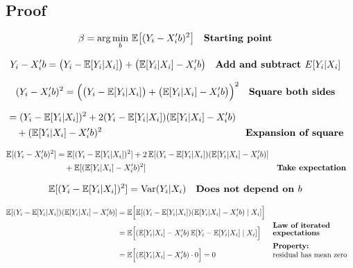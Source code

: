 \documentclass[12pt]{article}
\begin{document}
\subsection*{\noindent\textbf{Proof}}

\singlespacing
\begin{align}
\beta &= \arg \min_b \, \mathbb{E}\big[(Y_i - X_i'b)^2\big] && \text{\textbf{Starting point}} 
\end{align}

\begin{align}
Y_i - X_i'b 
    &= \big(Y_i - \mathbb{E}[Y_i|X_i]\big) + \big(\mathbb{E}[Y_i|X_i] - X_i'b\big) && \text{\textbf{Add and subtract $E[Y_i|X_i]$}} 
\end{align}

\begin{align}
(Y_i - X_i'b)^2 
    &= \Big(\big(Y_i - \mathbb{E}[Y_i|X_i]\big) + \big(\mathbb{E}[Y_i|X_i] - X_i'b\big)\Big)^2 && \text{\textbf{Square both sides}} 
\end{align}

\begin{align}
&= (Y_i - \mathbb{E}[Y_i|X_i])^2 
   + 2(Y_i - \mathbb{E}[Y_i|X_i])(\mathbb{E}[Y_i|X_i] - X_i'b) \\
&\quad + (\mathbb{E}[Y_i|X_i] - X_i'b)^2 && \text{\textbf{Expansion of square}} 
\end{align}

\begin{align}
\mathbb{E}[(Y_i - X_i'b)^2] 
   &= \mathbb{E}[(Y_i - \mathbb{E}[Y_i|X_i])^2] 
   + 2\,\mathbb{E}[(Y_i - \mathbb{E}[Y_i|X_i])(\mathbb{E}[Y_i|X_i] - X_i'b)] \\
   &\quad + \mathbb{E}[(\mathbb{E}[Y_i|X_i] - X_i'b)^2] && \text{\textbf{Take expectation}} 
\end{align}

\begin{align}
\mathbb{E}[(Y_i - \mathbb{E}[Y_i|X_i])^2] 
   &= \text{Var}(Y_i|X_i) && \text{\textbf{Does not depend on $b$}} 
\end{align}

\begin{align}
\mathbb{E}[(Y_i - \mathbb{E}[Y_i|X_i])(\mathbb{E}[Y_i|X_i] - X_i'b)] 
   &= \mathbb{E}\Big[\mathbb{E}[(Y_i - \mathbb{E}[Y_i|X_i])(\mathbb{E}[Y_i|X_i] - X_i'b) \mid X_i]\Big] \\
   &= \mathbb{E}\Big[(\mathbb{E}[Y_i|X_i] - X_i'b)\,\mathbb{E}[Y_i - \mathbb{E}[Y_i|X_i]\mid X_i]\Big] && \shortstack[l]{\textbf{Law of iterated} \\ \textbf{expectations}} \\
   &= \mathbb{E}\Big[(\mathbb{E}[Y_i|X_i] - X_i'b)\cdot 0\Big] = 0 && \shortstack[l]{\textbf{Property:} \\ residual has mean zero} 
\end{align}
\end{document}
